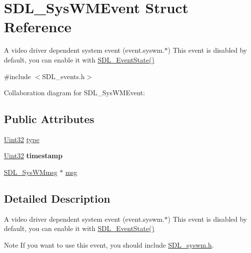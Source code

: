 \hypertarget{struct_s_d_l___sys_w_m_event}{}\section{S\+D\+L\+\_\+\+Sys\+W\+M\+Event Struct Reference}
\label{struct_s_d_l___sys_w_m_event}


A video driver dependent system event (event.\+syswm.$\ast$) This event is disabled by default, you can enable it with \hyperlink{_s_d_l__events_8h_afb772893e1c46f186fa39a4defe76df3}{S\+D\+L\+\_\+\+Event\+State()}  




{\ttfamily \#include $<$S\+D\+L\+\_\+events.\+h$>$}



Collaboration diagram for S\+D\+L\+\_\+\+Sys\+W\+M\+Event\+:
\subsection*{Public Attributes}
\begin{DoxyCompactItemize}
\item 
\hyperlink{_s_d_l__stdinc_8h_add440eff171ea5f55cb00c4a9ab8672d}{Uint32} \hyperlink{struct_s_d_l___sys_w_m_event_a84697e96cb16bf6a570e10b5bfdcd392}{type}
\item 
\hypertarget{struct_s_d_l___sys_w_m_event_a5d3cb97006d99b620c2671c27bd82c06}{}\hyperlink{_s_d_l__stdinc_8h_add440eff171ea5f55cb00c4a9ab8672d}{Uint32} {\bfseries timestamp}\label{struct_s_d_l___sys_w_m_event_a5d3cb97006d99b620c2671c27bd82c06}

\item 
\hyperlink{struct_s_d_l___sys_w_mmsg}{S\+D\+L\+\_\+\+Sys\+W\+Mmsg} $\ast$ \hyperlink{struct_s_d_l___sys_w_m_event_ad5e3dc68aa15582cd0641847d41c74e8}{msg}
\end{DoxyCompactItemize}


\subsection{Detailed Description}
A video driver dependent system event (event.\+syswm.$\ast$) This event is disabled by default, you can enable it with \hyperlink{_s_d_l__events_8h_afb772893e1c46f186fa39a4defe76df3}{S\+D\+L\+\_\+\+Event\+State()} 

\begin{DoxyNote}{Note}
If you want to use this event, you should include \hyperlink{_s_d_l__syswm_8h}{S\+D\+L\+\_\+syswm.\+h}. 
\end{DoxyNote}


